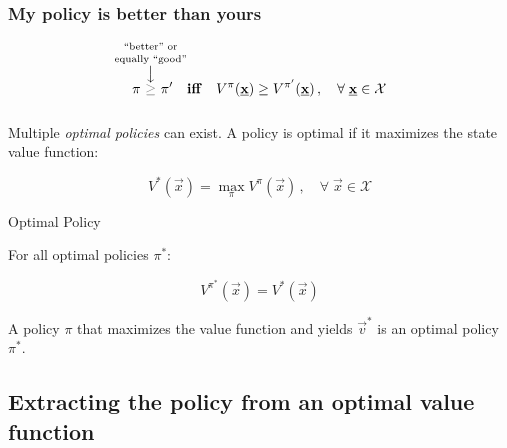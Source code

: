 \begin{frame}\frametitle{My policy is better than yours}


\begin{equation}
\pi~
\overset{\mathclap{\substack{%
					\text{``better'' or}\\[1mm]\text{equally ``good''}\\ \big\downarrow
					}}}{{\color{gray}\ge}}
~\pi' 
\quad \text{\textbf{iff}} \quad V^{\pi} (\vec x) \ge V^{\pi'} (\vec x)\,,\quad \forall\; \vec x \in \mathcal{X}
\end{equation}

\end{frame}

\begin{frame}\frametitle{\subsecname}

Multiple \emph{optimal policies} can exist. A policy is optimal if it maximizes the state value function:

\begin{equation}
V^{*}(\vec x) = \max_{\pi} V^{\pi} (\vec x)\,,\quad \forall\; \vec x \in \mathcal{X}
\end{equation}

\begin{block}{Optimal Policy}

For all optimal policies $\pi^{*}$:

\begin{equation}
    V^{\pi^{*}}(\vec x) = V^{*}(\vec x) 
\end{equation}

A policy $\pi$ that maximizes the value function and yields $\vec v^{*}$ is an optimal policy $\pi^{*}$.
    
\end{block}

    
\end{frame}

\subsection{Extracting the policy from an optimal value function}

